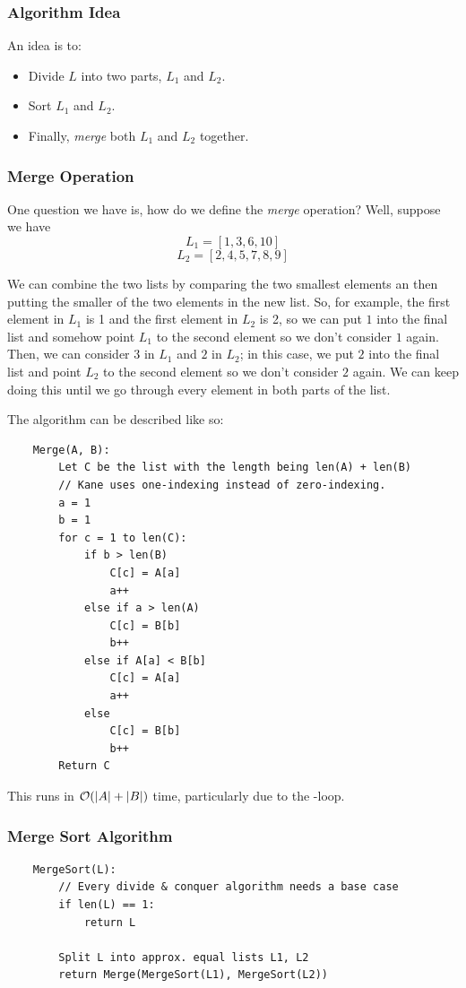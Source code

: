 \documentclass[letterpaper]{article}
\begin{document}
\subsubsection{Algorithm Idea}
An idea is to: 
\begin{itemize}
    \item Divide $L$ into two parts, $L_1$ and $L_2$. 
    \item Sort $L_1$ and $L_2$. 
    \item Finally, \emph{merge} both $L_1$ and $L_2$ together. 
\end{itemize}

\subsubsection{Merge Operation}
One question we have is, how do we define the \emph{merge} operation? Well, suppose we have
\[L_1 = [1, 3, 6, 10]\]
\[L_2 = [2, 4, 5, 7, 8, 9]\]

We can combine the two lists by comparing the two smallest elements an then putting the smaller of the two elements in the new list. So, for example, the first element in $L_1$ is 1 and the first element in $L_2$ is 2, so we can put $1$ into the final list and somehow point $L_1$ to the second element so we don't consider $1$ again. Then, we can consider $3$ in $L_1$ and $2$ in $L_2$; in this case, we put $2$ into the final list and point $L_2$ to the second element so we don't consider $2$ again. We can keep doing this until we go through every element in both parts of the list. 

\bigskip 

The algorithm can be described like so: 
\begin{verbatim}
    Merge(A, B):
        Let C be the list with the length being len(A) + len(B)
        // Kane uses one-indexing instead of zero-indexing.
        a = 1 
        b = 1
        for c = 1 to len(C):
            if b > len(B)
                C[c] = A[a]
                a++ 
            else if a > len(A)
                C[c] = B[b]
                b++ 
            else if A[a] < B[b]
                C[c] = A[a]
                a++ 
            else 
                C[c] = B[b]
                b++ 
        Return C
\end{verbatim}
This runs in $\mathcal{O}(|A| + |B|)$ time, particularly due to the -loop. 

\subsubsection{Merge Sort Algorithm}
\begin{verbatim}
    MergeSort(L):
        // Every divide & conquer algorithm needs a base case 
        if len(L) == 1:
            return L
        
        Split L into approx. equal lists L1, L2
        return Merge(MergeSort(L1), MergeSort(L2))
\end{verbatim}
\end{document}
